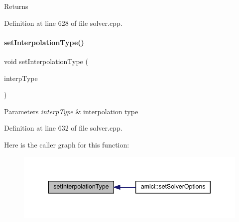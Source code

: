 \begin{DoxyReturn}{Returns}

\end{DoxyReturn}


Definition at line 628 of file solver.\+cpp.

\mbox{\label{classamici_1_1_solver_a9d9a0a5f8cdfdb993960706c646e240f}} 
\paragraph{\texorpdfstring{set\+Interpolation\+Type()}{setInterpolationType()}}
{\footnotesize\ttfamily void set\+Interpolation\+Type (\begin{DoxyParamCaption}\item[{\mbox{\hyperlink{namespaceamici_a8472f01c511d77bbfb981a46618ea1ea}{Interpolation\+Type}}}]{interp\+Type }\end{DoxyParamCaption})}


\begin{DoxyParams}{Parameters}
{\em interp\+Type} & interpolation type \\
\hline
\end{DoxyParams}


Definition at line 632 of file solver.\+cpp.

Here is the caller graph for this function\+:
\nopagebreak
\begin{figure}[H]
\begin{center}
\leavevmode
\includegraphics[width=343pt]{classamici_1_1_solver_a9d9a0a5f8cdfdb993960706c646e240f_icgraph}
\end{center}
\end{figure}
\mbox{\label{classamici_1_1_solver_ac758cf7c51f50db18ea58898623ce12c}} 
